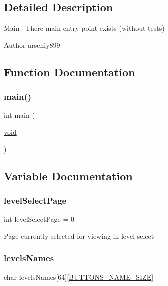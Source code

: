 \subsection{Detailed Description}
Main~\newline
There main entry point exists (without tests) 

\begin{DoxyAuthor}{Author}
arseniy899 
\end{DoxyAuthor}


\subsection{Function Documentation}
\mbox{\label{group___main_ga840291bc02cba5474a4cb46a9b9566fe}} 
\subsubsection{\texorpdfstring{main()}{main()}}
{\footnotesize\ttfamily int main (\begin{DoxyParamCaption}\item[{\hyperlink{png_8h_ac9c84fa68bbad002983e35ce3663c686}{void}}]{ }\end{DoxyParamCaption})}



\subsection{Variable Documentation}
\mbox{\label{group___main_ga75f52c6778fb4d3418ef0925d17fb164}} 
\subsubsection{\texorpdfstring{level\+Select\+Page}{levelSelectPage}}
{\footnotesize\ttfamily int level\+Select\+Page = 0}

Page currently selected for viewing in level select \mbox{\label{group___main_gae5cb82a78ca4ac2c20f9d071e7124f38}} 
\subsubsection{\texorpdfstring{levels\+Names}{levelsNames}}
{\footnotesize\ttfamily char levels\+Names\mbox{[}64\mbox{]}\mbox{[}\hyperlink{group___button_ga5a86b4b0ec8a21993f74ae423ec74538}{B\+U\+T\+T\+O\+N\+S\+\_\+\+N\+A\+M\+E\+\_\+\+S\+I\+ZE}\mbox{]}}



